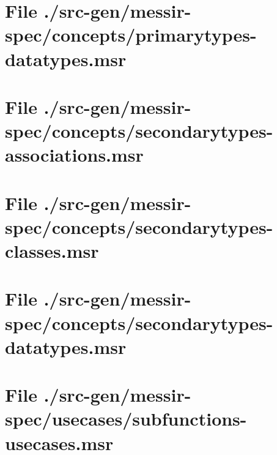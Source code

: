 \section[File /src-gen/messir-spec/concepts/primarytypes-datatypes.msr]{File ./src-gen/messir-spec/concepts/primarytypes-datatypes.msr}
\scriptsize

\normalsize
	
\section[File /src-gen/messir-spec/concepts/secondarytypes-associations.msr]{File ./src-gen/messir-spec/concepts/secondarytypes-associations.msr}
\scriptsize

\normalsize
	
\section[File /src-gen/messir-spec/concepts/secondarytypes-classes.msr]{File ./src-gen/messir-spec/concepts/secondarytypes-classes.msr}
\scriptsize

\normalsize
	
\section[File /src-gen/messir-spec/concepts/secondarytypes-datatypes.msr]{File ./src-gen/messir-spec/concepts/secondarytypes-datatypes.msr}
\scriptsize

\normalsize
	
\section[File /src-gen/messir-spec/usecases/subfunctions-usecases.msr]{File ./src-gen/messir-spec/usecases/subfunctions-usecases.msr}
\scriptsize

\normalsize
	
